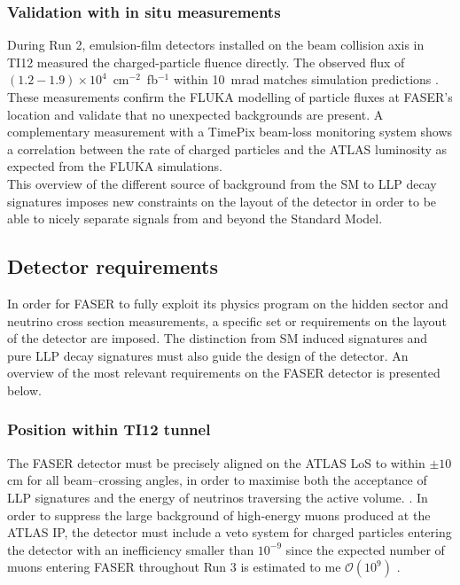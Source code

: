 		\subsubsection{Validation with in situ measurements}  
		During Run 2, emulsion-film detectors installed on the beam collision axis in TI12 measured the charged-particle fluence directly. The observed flux of $(1.2-1.9)\times10^4$~cm$^{-2}$~fb$^{-1}$ within \SI{10}{\milli\radian} matches simulation predictions \cite{FASER_techprop}. These measurements confirm the FLUKA modelling of particle fluxes at FASER’s location and validate that no unexpected backgrounds are present. A complementary measurement with a TimePix beam-loss monitoring system shows a correlation between the rate of charged particles and the ATLAS luminosity as expected from the FLUKA simulations. \\
		
		This overview of the different source of background from the SM to LLP decay signatures imposes new constraints on the layout of the detector in order to be able to nicely separate signals from and beyond the Standard Model. 
		
		\subsection{Detector requirements}
		
		In order for FASER to fully exploit its physics program on the hidden sector and neutrino cross section measurements, a specific set or requirements on the layout of the detector are imposed. The distinction from SM induced signatures and pure LLP decay signatures must also guide the design of the detector. An overview of the most relevant requirements on the FASER detector is presented below. 
		
		\subsubsection{Position within TI12 tunnel}
		The FASER detector must be precisely aligned on the ATLAS LoS to within \(\pm10\)\,cm for all beam–crossing angles, in order to maximise both the acceptance of LLP signatures and the energy of neutrinos traversing the active volume. \cite{FASER_Detector}. In order to suppress the large background of high‐energy muons produced at the ATLAS IP, the detector must include a veto system for charged particles entering the detector with an inefficiency smaller than $10^{-9}$ since the expected number of muons entering FASER throughout Run 3 is estimated to me $\mathcal{O}(10^9)$ \cite{FASER_Detector}.
		
